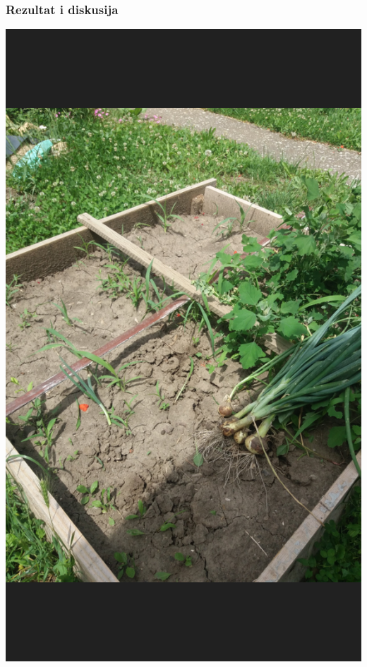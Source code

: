 \documentclass{beamer}
\begin{document}
\begin{frame}
  \frametitle{Rezultat i diskusija}
  \includegraphics[height=0.85\textheight]{slike/basta2}\centering
\end{frame}
\end{document}
